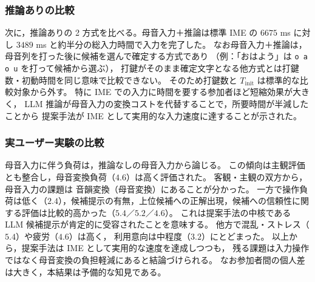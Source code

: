 \subsubsection{推論ありの比較}
次に，推論ありの 2 方式を比べる。母音入力＋推論は標準 IME の
$6675$ ms に対し $3489$ ms と約半分の総入力時間で入力を完了した。
なお母音入力＋推論は，母音列を打った後に候補を選んで確定する方式であり
（例：「おはよう」は \texttt{o a o u} を打って候補から選ぶ），
打鍵がそのまま確定文字となる他方式とは打鍵数・初動時間を同じ意味で比較できない。
そのため打鍵数と $T_{\mathrm{init}}$ は標準的な比較対象から外す。
特に IME での入力に時間を要する参加者ほど短縮効果が大きく，
LLM 推論が母音入力の変換コストを代替することで，所要時間が半減したことから
提案手法が IME として実用的な入力速度に達することが示された。

\subsubsection{実ユーザー実験の比較}
母音入力に伴う負荷は，推論なしの母音入力から論じる。
この傾向は主観評価とも整合し，母音変換負荷（$4.6$）は高く評価された。
客観・主観の双方から，母音入力の課題は
音韻変換（母音変換）にあることが分かった。
一方で操作負荷は低く（$2.4$），候補提示の有無，上位候補への正解出現，候補への信頼性に関する評価は比較的高かった（$5.4$／$5.2$／$4.6$）。
これは提案手法の中核である LLM 候補提示が肯定的に受容されたことを意味する。
他方で混乱・ストレス（$5.4$）や疲労（$4.6$）は高く，
利用意向は中程度（$3.2$）にとどまった。
以上から，提案手法は IME として実用的な速度を達成しつつも，
残る課題は入力操作ではなく母音変換の負担軽減にあると結論づけられる。
なお参加者間の個人差は大きく，本結果は予備的な知見である。
